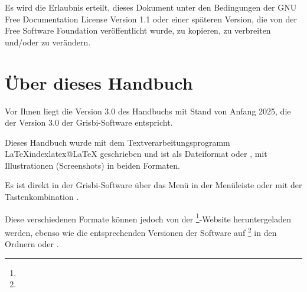 Es wird die Erlaubnis erteilt, dieses Dokument unter den Bedingungen der GNU Free Documentation License Version 1.1 oder einer späteren Version, die von der \gls{Free Software Foundation} veröffentlicht wurde, zu kopieren, zu verbreiten und/oder zu verändern.

\section{Über dieses Handbuch\label{introduction-manual}}


Vor Ihnen liegt die Version 3.0 des Handbuchs mit Stand von \actuality{}Anfang 2025, die der Version 3.0 der Grisbi-Software entspricht.




Dieses Handbuch wurde mit dem Textverarbeitungsprogramm \gls{LaTeX}index{latex@LaTeX} geschrieben und ist als \gls{Dateiformat}  oder , mit Illustrationen (Screenshots) in beiden Formaten.

Es ist direkt in der Grisbi-Software über das Menü  in der Menüleiste oder mit der Tastenkombination .

Diese verschiedenen Formate können jedoch von der \footnote{\urlSourceForgeDocumentation{}}-Website heruntergeladen werden, ebenso wie die entsprechenden Versionen der Software auf \footnote{\urlSourceForge{}} in den Ordnern  oder .

